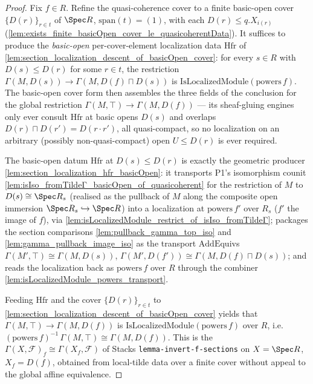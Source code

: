 \begin{proof}
  Fix \(f \in R\). Refine the quasi-coherence cover to a finite basic-open cover
  \(\{D(r)\}_{r \in t}\) of \(\Spec R\), \(\mathrm{span}(t) = (1)\), with each \(D(r) \le q.X_{i(r)}\)
  (\cref{lem:exists_finite_basicOpen_cover_le_quasicoherentData}). It suffices to produce the
  \emph{basic-open} per-cover-element localization data \(\mathrm{Hfr}\) of
  \cref{lem:section_localization_descent_of_basicOpen_cover}: for every \(s \in R\) with
  \(D(s) \le D(r)\) for some \(r \in t\), the restriction
  \(\Gamma(M, D(s)) \to \Gamma(M, D(f) \sqcap D(s))\) is
  \(\mathrm{IsLocalizedModule}(\mathrm{powers}\,f)\). The basic-open cover form then assembles the three
  fields of the conclusion for the global restriction \(\Gamma(M, \top) \to \Gamma(M, D(f))\) --- its
  sheaf-gluing engines only ever consult \(\mathrm{Hfr}\) at basic opens \(D(s)\) and overlaps
  \(D(r) \sqcap D(r') = D(r \cdot r')\), all quasi-compact, so no localization on an arbitrary
  (possibly non-quasi-compact) open \(U \le D(r)\) is ever required.

  The basic-open datum \(\mathrm{Hfr}\) at \(D(s) \le D(r)\) is exactly the geometric producer
  \cref{lem:section_localization_hfr_basicOpen}: it transports P1's isomorphism counit
  \cref{lem:isIso_fromTildeΓ_basicOpen_of_quasicoherent} for the restriction of \(M\) to
  \(D(s) \cong \Spec R_s\) (realised as the pullback of \(M\) along the composite open immersion
  \(\Spec R_s \hookrightarrow \Spec R\)) into a localization at \(\mathrm{powers}\,f'\) over \(R_s\)
  (\(f'\) the image of \(f\)), via \cref{lem:isLocalizedModule_restrict_of_isIso_fromTildeΓ}; packages
  the section comparisons \cref{lem:pullback_gamma_top_iso} and \cref{lem:gamma_pullback_image_iso} as
  the transport \(\mathrm{AddEquiv}\)s \(\Gamma(M', \top) \cong \Gamma(M, D(s))\),
  \(\Gamma(M', D(f')) \cong \Gamma(M, D(f) \sqcap D(s))\); and reads the localization back as
  \(\mathrm{powers}\,f\) over \(R\) through the combiner \cref{lem:isLocalizedModule_powers_transport}.

  Feeding \(\mathrm{Hfr}\) and the cover \(\{D(r)\}_{r\in t}\) to
  \cref{lem:section_localization_descent_of_basicOpen_cover} yields that
  \(\Gamma(M, \top) \to \Gamma(M, D(f))\) is \(\mathrm{IsLocalizedModule}(\mathrm{powers}\,f)\) over
  \(R\), i.e.\ \((\mathrm{powers}\,f)^{-1}\,\Gamma(M, \top) \cong \Gamma(M, D(f))\). This is the
  \(\Gamma(X, \mathcal{F})_f \cong \Gamma(X_f, \mathcal{F})\) of Stacks
  \texttt{lemma-invert-f-sections} on \(X = \Spec R\), \(X_f = D(f)\), obtained from local-tilde data
  over a finite cover without appeal to the global affine equivalence.
\end{proof}


